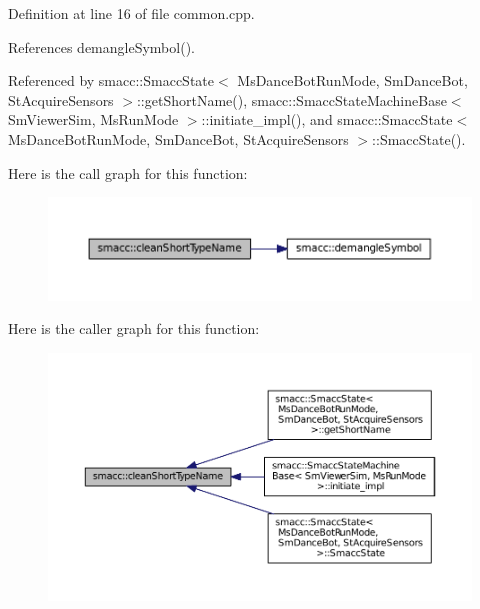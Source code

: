Definition at line 16 of file common.\+cpp.



References demangle\+Symbol().



Referenced by smacc\+::\+Smacc\+State$<$ Ms\+Dance\+Bot\+Run\+Mode, Sm\+Dance\+Bot, St\+Acquire\+Sensors $>$\+::get\+Short\+Name(), smacc\+::\+Smacc\+State\+Machine\+Base$<$ Sm\+Viewer\+Sim, Ms\+Run\+Mode $>$\+::initiate\+\_\+impl(), and smacc\+::\+Smacc\+State$<$ Ms\+Dance\+Bot\+Run\+Mode, Sm\+Dance\+Bot, St\+Acquire\+Sensors $>$\+::\+Smacc\+State().




Here is the call graph for this function\+:
\nopagebreak
\begin{figure}[H]
\begin{center}
\leavevmode
\includegraphics[width=350pt]{namespacesmacc_a09b297b1cdb9aae93a958f323431464a_cgraph}
\end{center}
\end{figure}




Here is the caller graph for this function\+:
\nopagebreak
\begin{figure}[H]
\begin{center}
\leavevmode
\includegraphics[width=350pt]{namespacesmacc_a09b297b1cdb9aae93a958f323431464a_icgraph}
\end{center}
\end{figure}



